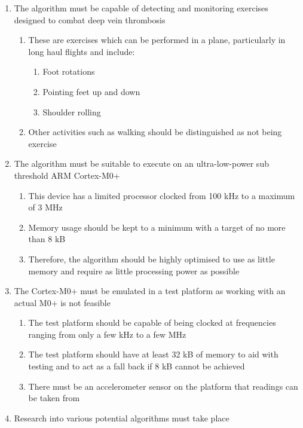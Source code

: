 \begin{enumerate}
  \item The algorithm must be capable of detecting and monitoring exercises designed to combat deep vein thrombosis
  \begin{enumerate}[label*=\arabic*.]
    \item These are exercises which can be performed in a plane, particularly in long haul flights and include:
    \begin{enumerate}[label*=\arabic*.]
      \item Foot rotations
      \item Pointing feet up and down
      \item Shoulder rolling
    \end{enumerate}
    \item Other activities such as walking should be distinguished as not being exercise
  \end{enumerate}
  \item The algorithm must be suitable to execute on an ultra-low-power sub threshold ARM Cortex-M0+
  \begin{enumerate}[label*=\arabic*.]
    \item This device has a limited processor clocked from 100 kHz to a maximum of 3 MHz
    \item Memory usage should be kept to a minimum with a target of no more than 8 kB
    \item Therefore, the algorithm should be highly optimised to use as little memory and require as little processing power as possible
  \end{enumerate}
  \item The Cortex-M0+ must be emulated in a test platform as working with an actual M0+ is not feasible
  \begin{enumerate}[label*=\arabic*.]
    \item The test platform should be capable of being clocked at frequencies ranging from only a few kHz to a few MHz
    \item The test platform should have at least 32 kB of memory to aid with testing and to act as a fall back if 8 kB cannot be achieved
    \item There must be an accelerometer sensor on the platform that readings can be taken from
  \end{enumerate}
  \item Research into various potential algorithms must take place
  \begin{enumerate}[label*=\arabic*.]

\end{enumerate}
\end{enumerate}
